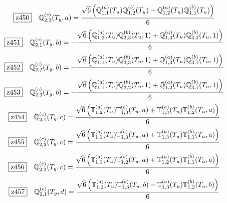 \documentclass[fleqn,10pt,landscape]{jsarticle}
\begin{document}
\begin{dmath*}
\hspace*{3mm}\fbox{z450}\quad \mathbb{Q}_{2,3}^{(c)}(T_{g},a)=\frac{\sqrt{6} \left(\mathbb{Q}_{1,1}^{(a)}(T_{u}) \mathbb{Q}_{1,2}^{(b)}(T_{u}) + \mathbb{Q}_{1,2}^{(a)}(T_{u}) \mathbb{Q}_{1,1}^{(b)}(T_{u})\right)}{6}
\end{dmath*}
\begin{dmath*}
\hspace*{3mm}\fbox{z451}\quad \mathbb{Q}_{2,1}^{(c)}(T_{g},b)=- \frac{\sqrt{6} \left(\mathbb{Q}_{1,2}^{(a)}(T_{u}) \mathbb{Q}_{3,3}^{(b)}(T_{u},1) + \mathbb{Q}_{1,3}^{(a)}(T_{u}) \mathbb{Q}_{3,2}^{(b)}(T_{u},1)\right)}{6}
\end{dmath*}
\begin{dmath*}
\hspace*{3mm}\fbox{z452}\quad \mathbb{Q}_{2,2}^{(c)}(T_{g},b)=- \frac{\sqrt{6} \left(\mathbb{Q}_{1,1}^{(a)}(T_{u}) \mathbb{Q}_{3,3}^{(b)}(T_{u},1) + \mathbb{Q}_{1,3}^{(a)}(T_{u}) \mathbb{Q}_{3,1}^{(b)}(T_{u},1)\right)}{6}
\end{dmath*}
\begin{dmath*}
\hspace*{3mm}\fbox{z453}\quad \mathbb{Q}_{2,3}^{(c)}(T_{g},b)=- \frac{\sqrt{6} \left(\mathbb{Q}_{1,1}^{(a)}(T_{u}) \mathbb{Q}_{3,2}^{(b)}(T_{u},1) + \mathbb{Q}_{1,2}^{(a)}(T_{u}) \mathbb{Q}_{3,1}^{(b)}(T_{u},1)\right)}{6}
\end{dmath*}
\begin{dmath*}
\hspace*{3mm}\fbox{z454}\quad \mathbb{Q}_{2,1}^{(c)}(T_{g},c)=\frac{\sqrt{6} \left(\mathbb{T}_{1,2}^{(a)}(T_{u}) \mathbb{T}_{1,3}^{(b)}(T_{u},a) + \mathbb{T}_{1,3}^{(a)}(T_{u}) \mathbb{T}_{1,2}^{(b)}(T_{u},a)\right)}{6}
\end{dmath*}
\begin{dmath*}
\hspace*{3mm}\fbox{z455}\quad \mathbb{Q}_{2,2}^{(c)}(T_{g},c)=\frac{\sqrt{6} \left(\mathbb{T}_{1,1}^{(a)}(T_{u}) \mathbb{T}_{1,3}^{(b)}(T_{u},a) + \mathbb{T}_{1,3}^{(a)}(T_{u}) \mathbb{T}_{1,1}^{(b)}(T_{u},a)\right)}{6}
\end{dmath*}
\begin{dmath*}
\hspace*{3mm}\fbox{z456}\quad \mathbb{Q}_{2,3}^{(c)}(T_{g},c)=\frac{\sqrt{6} \left(\mathbb{T}_{1,1}^{(a)}(T_{u}) \mathbb{T}_{1,2}^{(b)}(T_{u},a) + \mathbb{T}_{1,2}^{(a)}(T_{u}) \mathbb{T}_{1,1}^{(b)}(T_{u},a)\right)}{6}
\end{dmath*}
\begin{dmath*}
\hspace*{3mm}\fbox{z457}\quad \mathbb{Q}_{2,1}^{(c)}(T_{g},d)=\frac{\sqrt{6} \left(\mathbb{T}_{1,2}^{(a)}(T_{u}) \mathbb{T}_{1,3}^{(b)}(T_{u},b) + \mathbb{T}_{1,3}^{(a)}(T_{u}) \mathbb{T}_{1,2}^{(b)}(T_{u},b)\right)}{6}
\end{dmath*}
\end{document}
